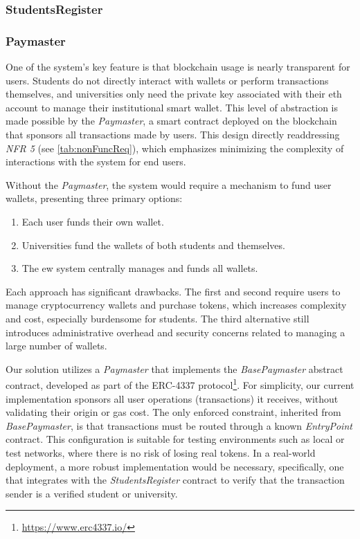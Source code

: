 \subsubsection{StudentsRegister}

\subsubsection{Paymaster}
One of the system's key feature is that blockchain usage is nearly transparent for users. Students do not directly interact with wallets or perform transactions themselves, and universities only need the private key associated with their \acrshort{eth} account to manage their institutional smart wallet. This level of abstraction is made possible by the \textit{Paymaster}, a smart contract deployed on the blockchain that sponsors all transactions made by users. This design directly readdressing \textit{NFR 5} (see \cref{tab:nonFuncReq}), which emphasizes minimizing the complexity of interactions with the system for end users.

Without the \textit{Paymaster}, the system would require a mechanism to fund user wallets, presenting three primary options:

\begin{enumerate}
    \item Each user funds their own wallet.
    \item Universities fund the wallets of both students and themselves.
    \item The \acrshort{ew} system centrally manages and funds all wallets.
\end{enumerate}
Each approach has significant drawbacks. The first and second require users to manage cryptocurrency wallets and purchase tokens, which increases complexity and cost, especially burdensome for students. The third alternative still introduces administrative overhead and security concerns related to managing a large number of wallets.

Our solution utilizes a \textit{Paymaster} that implements the \textit{BasePaymaster} abstract contract, developed as part of the ERC-4337 protocol\footnote{\url{https://www.erc4337.io/}}. For simplicity, our current implementation sponsors all user operations (transactions) it receives, without validating their origin or gas cost. The only enforced constraint, inherited from \textit{BasePaymaster}, is that transactions must be routed through a known \textit{EntryPoint} contract.
This configuration is suitable for testing environments such as local or test networks, where there is no risk of losing real tokens. In a real-world deployment, a more robust implementation would be necessary, specifically, one that integrates with the \textit{StudentsRegister} contract to verify that the transaction sender is a verified student or university. 

